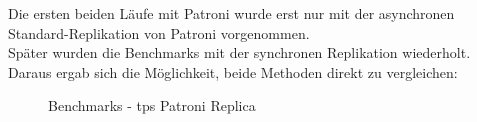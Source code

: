 \begin{flushleft}
    Die ersten beiden Läufe mit Patroni wurde erst nur mit der asynchronen Standard-Replikation von Patroni vorgenommen.\\
    Später wurden die Benchmarks mit der synchronen Replikation wiederholt.\\
    Daraus ergab sich die Möglichkeit, beide Methoden direkt zu vergleichen:
    \begin{figure}[H]
        \centering
        \qquad
        \caption{Benchmarks - tps Patroni Replica}
        \label{fig:tps_patroni_replica}
    \end{figure}
    \begin{figure}[H]
        \centering

\end{figure}
\end{flushleft}
